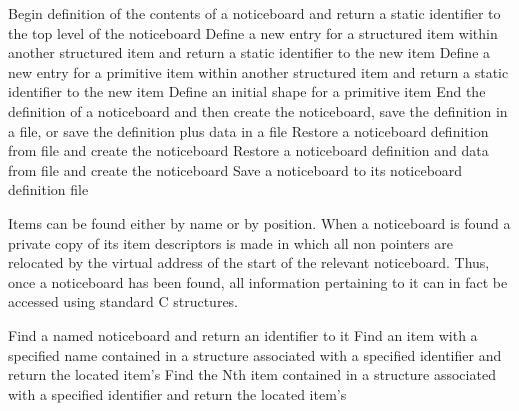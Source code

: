 \begin{mansectionroutines}
      Begin definition of the contents of a noticeboard
      and return a static identifier to the top level of the noticeboard
      Define a new entry for a structured item within another structured item
      and return a static identifier to the new item
      Define a new entry for a primitive item within another structured item
      and return a static identifier to the new item
      Define an initial shape for a primitive item
      End the definition of a noticeboard
      and then create the noticeboard, save the definition in a file, or save
      the definition plus data in a file
      Restore a noticeboard definition from file
      and create the noticeboard
      Restore a noticeboard definition and data from file
      and create the noticeboard
      Save a noticeboard to its noticeboard definition file
\end{mansectionroutines}

      Items can be found either by name or by position. When a noticeboard
      is found a private copy of its item descriptors is made in which all
      non {} pointers are relocated by the virtual address of the %
start of
      the relevant noticeboard. Thus, once a noticeboard has been found, all
      information pertaining to it can in fact be accessed using standard C
      structures.

\begin{mansectionroutines}
      Find a named noticeboard and return an identifier to it
      Find an item with a specified name contained in a structure
      associated with a specified identifier and return the located item's
      {}
      Find the Nth item contained in a structure
      associated with a specified identifier and return the located item's {%
}
\end{mansectionroutines}

